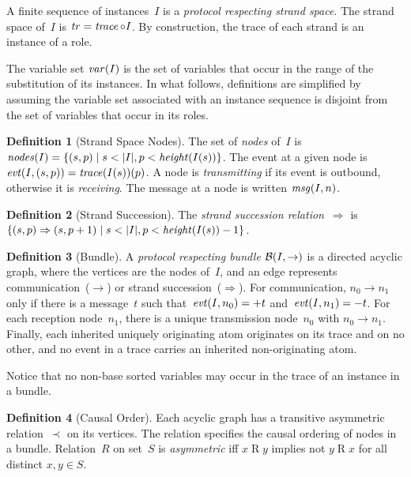 \documentclass[12pt]{article}
\theoremstyle{definition}
\newtheorem{defn}{Definition}[section]
\begin{document}
A finite sequence of instances~$I$ is a \emph{protocol respecting
  strand space}.  The strand space of~$I$ is $\operatorname{\mathit{tr}}=\operatorname{\mathit{trace}}\circ
I$.  By construction, the trace of each strand is an instance of a
role.

The variable set $\operatorname{\mathit{var}}(I)$ is the set of variables that occur in
the range of the substitution of its instances.  In what follows,
definitions are simplified by assuming the variable set associated
with an instance sequence is disjoint from the set of variables that
occur in its roles.

\begin{defn}[Strand Space Nodes]
The set of \emph{nodes} of~$I$ is $\fn{nodes}(I)=\{(s,p)\mid s<|I|,
p<\fn{height}(I(s))\}$.  The event at a given node is
$\operatorname{\mathit{evt}}(I,(s,p))=\operatorname{\mathit{trace}}(I(s))(p)$.  A node is \emph{transmitting}
if its event is outbound, otherwise it is \emph{receiving}.
The message at a node is written $\operatorname{\mathit{msg}}(I,n)$.
\end{defn}

\begin{defn}[Strand Succession]
The \emph{strand succession relation}~$\Rightarrow$ is
$\{(s,p)\Rightarrow(s,p+1)\mid s<|I|, p<\fn{height}(I(s))-1\}$.
\end{defn}

\begin{defn}[Bundle]\label{def:bundle}
A \emph{protocol respecting bundle} $\mathcal{B}(I,\to)$ is a directed
acyclic graph, where the vertices are the nodes of~$I$, and an edge
represents communication~($\rightarrow$) or strand
succession~($\Rightarrow$).  For communication, $n_0\rightarrow n_1$
only if there is a message~$t$ such that~$\operatorname{\mathit{evt}}(I,n_0)=\mathord + t$
and~$\operatorname{\mathit{evt}}(I,n_1)=\mathord - t$.  For each reception node~$n_1$, there
is a unique transmission node~$n_0$ with $n_0\rightarrow n_1$.
Finally, each inherited uniquely originating atom originates on its
trace and on no other, and no event in a trace carries an inherited
non-originating atom.
\end{defn}

Notice that no non-base sorted variables may occur in the trace of an
instance in a bundle.

\begin{defn}[Causal Order]
Each acyclic graph has a transitive asymmetric relation~$\prec$ on its
vertices.  The relation specifies the causal ordering of nodes in a
bundle.  Relation~$R$ on set~$S$ is \emph{asymmetric} iff $x\mathbin{R}y$ implies not
$y\mathbin{R}x$ for all distinct $x,y \in S$.
\end{defn}
\end{document}
